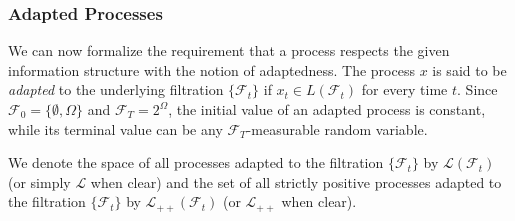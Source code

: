\documentclass[\topdir/lecture\_notes.tex]{subfiles}
\begin{document}



\subsubsection{Adapted Processes}
We can now formalize the requirement that a process respects the given information structure with the notion of adaptedness. The process $x$ is said to be \emph{adapted} to the underlying filtration $\{\mathcal{F}_{t}\}$ if $x_{t} \in L(\mathcal{F}_{t})$ for every time $t$. Since $\mathcal{F}_{0}=\{\emptyset, \Omega\}$ and $\mathcal{F}_{T}=2^{\Omega}$, the initial value of an adapted process is constant, while its terminal value can be any $\mathcal{F}_{T}$-measurable random variable.

We denote the space of all processes adapted to the filtration $\{\mathcal{F}_{t}\}$ by $\mathcal{L}(\mathcal{F}_{t})$ (or simply $\mathcal{L}$ when clear) and the set of all strictly positive processes adapted to the filtration $\{\mathcal{F}_{t}\}$ by  $\mathcal{L}_{++}(\mathcal{F}_{t})$ (or $\mathcal{L}_{++}$ when clear).
\end{document}
